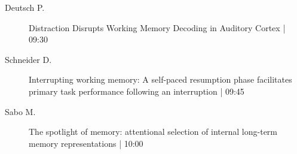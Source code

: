 \begin{symposium}
\begin{description}
                \item [ Deutsch P.] Distraction Disrupts Working Memory Decoding in Auditory Cortex \textcolor{mygray}{ | 09:30}    
                
                \item [ Schneider D.] Interrupting working memory: A self-paced resumption phase facilitates primary task performance following an interruption \textcolor{mygray}{ | 09:45}    
                
                \item [ Sabo M.] The spotlight of memory: attentional selection of internal long-term memory representations \textcolor{mygray}{ | 10:00}    
                
            \end{description} 
            \end{symposium}
            